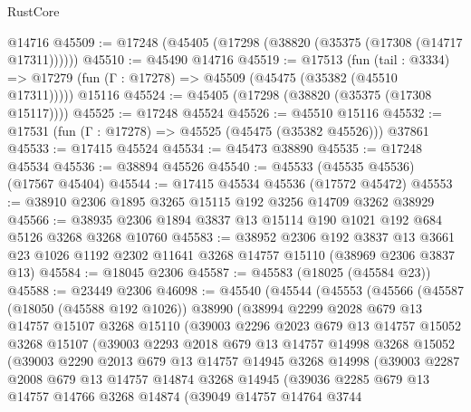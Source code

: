 \begin{lexlean}{RustCore}
\begin{coremodule}
    @14716
@45509 := @17248 (@45405 (@17298 (@38820 (@35375 (@17308 (@14717 @17311))))))
@45510 := @45490 @14716
@45519 := @17513
    (fun (tail : @3334) => @17279 (fun (Γ : @17278) => @45509 (@45475 (@35382 (@45510 @17311)))))
    @15116
@45524 := @45405 (@17298 (@38820 (@35375 (@17308 @15117))))
@45525 := @17248 @45524
@45526 := @45510 @15116
@45532 := @17531 (fun (Γ : @17278) => @45525 (@45475 (@35382 @45526))) @37861
@45533 := @17415 @45524
@45534 := @45473 @38890
@45535 := @17248 @45534
@45536 := @38894 @45526
@45540 := @45533 (@45535 @45536) (@17567 @45404)
@45544 := @17415 @45534 @45536 (@17572 @45472)
@45553 := @38910 @2306 @1895 @3265 @15115 @192 @3256 @14709 @3262 @38929
@45566 := @38935 @2306 @1894 @3837 @13 @15114 @190 @1021 @192 @684 @5126 @3268 @3268 @10760
@45583 := @38952
    @2306
    @192
    @3837
    @13
    @3661
    @23
    @1026
    @1192
    @2302
    @11641
    @3268
    @14757
    @15110
    (@38969 @2306 @3837 @13)
@45584 := @18045 @2306
@45587 := @45583 (@18025 (@45584 @23))
@45588 := @23449 @2306
@46098 := @45540
    (@45544
      (@45553
        (@45566
          (@45587
            (@18050 (@45588 @192 @1026))
            @38990
            (@38994
              @2299
              @2028
              @679
              @13
              @14757
              @15107
              @3268
              @15110
              (@39003
                @2296
                @2023
                @679
                @13
                @14757
                @15052
                @3268
                @15107
                (@39003
                  @2293
                  @2018
                  @679
                  @13
                  @14757
                  @14998
                  @3268
                  @15052
                  (@39003
                    @2290
                    @2013
                    @679
                    @13
                    @14757
                    @14945
                    @3268
                    @14998
                    (@39003
                      @2287
                      @2008
                      @679
                      @13
                      @14757
                      @14874
                      @3268
                      @14945
                      (@39036
                        @2285
                        @679
                        @13
                        @14757
                        @14766
                        @3268
                        @14874
                        (@39049
                          @14757
                          @14764
                          @3744

\end{coremodule}
\end{lexlean}
